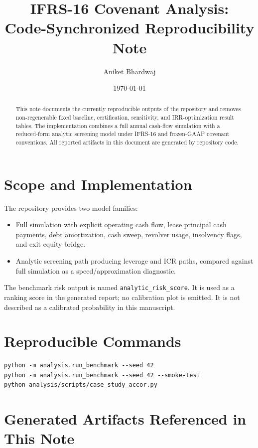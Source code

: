 ﻿\documentclass[11pt,a4paper]{article}
\title{IFRS-16 Covenant Analysis:\\Code-Synchronized Reproducibility Note}
\author{Aniket Bhardwaj}
\date{\today}
\begin{document}
\maketitle

\begin{abstract}
This note documents the currently reproducible outputs of the repository and removes non-regenerable fixed baseline, certification, sensitivity, and IRR-optimization result tables. The implementation combines a full annual cash-flow simulation with a reduced-form analytic screening model under IFRS-16 and frozen-GAAP covenant conventions. All reported artifacts in this document are generated by repository code.
\end{abstract}

\section{Scope and Implementation}

The repository provides two model families:
\begin{itemize}
\item Full simulation with explicit operating cash flow, lease principal cash payments, debt amortization, cash sweep, revolver usage, insolvency flags, and exit equity bridge.
\item Analytic screening path producing leverage and ICR paths, compared against full simulation as a speed/approximation diagnostic.
\end{itemize}

The benchmark risk output is named \texttt{analytic\_risk\_score}. It is used as a ranking score in the generated report; no calibration plot is emitted. It is not described as a calibrated probability in this manuscript.

\section{Reproducible Commands}

\begin{verbatim}
python -m analysis.run_benchmark --seed 42
python -m analysis.run_benchmark --seed 42 --smoke-test
python analysis/scripts/case_study_accor.py
\end{verbatim}

\section{Generated Artifacts Referenced in This Note}
\end{document}
